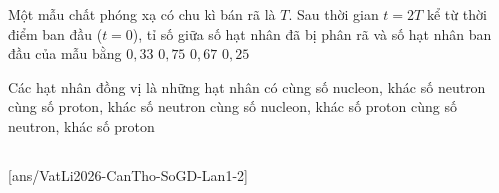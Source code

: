 	\begin{ex}%
		Một mẫu chất phóng xạ có chu kì bán rã là $T$. Sau thời gian $t=2T$ kể từ thời điểm ban đầu ($t=0$), tỉ số giữa số hạt nhân đã bị phân rã và số hạt nhân ban đầu của mẫu bằng
		\choice
		{$0{,}33$}
		{\True $0{,}75$}
		{$0{,}67$}
		{$0{,}25$}
	\end{ex}

	\begin{ex}%
		Các hạt nhân đồng vị là những hạt nhân có
		\choice
		{cùng số nucleon, khác số neutron}
		{\True cùng số proton, khác số neutron}
		{cùng số nucleon, khác số proton}
		{cùng số neutron, khác số proton}
	\end{ex}

	\subsection*{}
	\setcounter{ex}{0}
	[ans/VatLi2026-CanTho-SoGD-Lan1-2]

